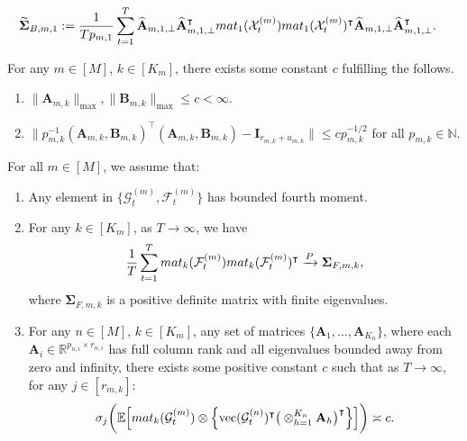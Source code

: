 \documentclass[10pt,a4paper]{amsart}
\def\E{\mathbb{E}}
\def\N{\mathbb{N}}
\def\R{\mathbb{R}}
\def\bA{\mathbf{A}}
\def\bB{\mathbf{B}}
\def\bI{\mathbf{I}}
\def\bSigma{\boldsymbol{\Sigma}} \def\bOmega{\boldsymbol{\Omega}}
\def\cF{\mathcal{F}}
\def\cG{\mathcal{G}} \def\cH{\boldsymbol{\mathcal{H}}} \def\cI{\mathcal{I}}
\def\cX{\mathcal{X}}
\def\mat{\textnormal{\textsc{mat}}}
\def\trans{\intercal}
\def\vec{\mathrm{vec}}
\def\wh#1{\widehat{#1}}
\def\wt#1{\widetilde{#1}}
\begin{document}
\begin{equation}
\label{eqn: def_tilde_Sigma_B_m1}
\begin{split}
    \wt\bSigma_{B,m,1} &:= \frac{1}{Tp_{m,1}} \sum_{t=1}^T \wh{\bA}_{m,1,\perp} \wh{\bA}_{m,1,\perp}^\trans \mat_1(\cX_t^{(m)}) \mat_1(\cX_t^{(m)})^\trans \wh{\bA}_{m,1,\perp} \wh{\bA}_{m,1,\perp}^\trans .
\end{split}
\end{equation}

\begin{assumption}\label{ass: loadings}
For any $m\in[M]$, $k\in[K_m]$, there exists some constant $c$ fulfilling the follows.
\begin{enumerate}[itemsep=0pt, label = (\alph*), left = 0pt]
    \item $\|\bA_{m,k}\|_{\max}, \|\bB_{m,k}\|_{\max} \leq c <\infty$.
    \item $\big\| p_{m,k}^{-1} (\bA_{m,k}, \bB_{m,k})^\trans (\bA_{m,k}, \bB_{m,k}) -\bI_{r_{m,k}+u_{m,k}} \big\| \leq c p_{m,k}^{-1/2}$ for all $p_{m,k}\in \N$.
\end{enumerate}
\end{assumption}

\begin{assumption}\label{ass: core_factor}
For all $m\in[M]$, we assume that:
\begin{enumerate}[itemsep=0pt, label = (\alph*), left = 0pt]
    \item Any element in $\big\{ \cG_t^{(m)}, \cF_t^{(m)} \big\}$ has bounded fourth moment.
    \item For any $k\in[K_m]$, as $T\to\infty$, we have
    \[
    \frac{1}{T} \sum_{t=1}^T \mat_k(\cF_t^{(m)}) \mat_k(\cF_t^{(m)})^\trans \xrightarrow{P} \bSigma_{F,m,k} ,
    \]
    where $\bSigma_{F,m,k}$ is a positive definite matrix with finite eigenvalues.
    \item For any $n\in [M]$, $k\in[K_m]$, any set of matrices $\{ \bA_1, \dots, \bA_{K_n}\}$, where each $\bA_i\in \R^{p_{n,i} \times r_{n,i}}$ has full column rank and all eigenvalues bounded away from zero and infinity, there exists some positive constant $c$ such that as $T\to\infty$, for any $j\in[r_{m,k}]$:
    \[
    \sigma_{j}\bigg( \E\Big[ \mat_k(\cG_t^{(m)}) \otimes \Big\{ \vec(\cG_t^{(n)})^\trans \big( \otimes_{h=1}^{K_n} \bA_{h} \big)^\trans \Big\} \Big] \bigg) \asymp c .
    \]
\end{enumerate}
\end{assumption}
\end{document}
